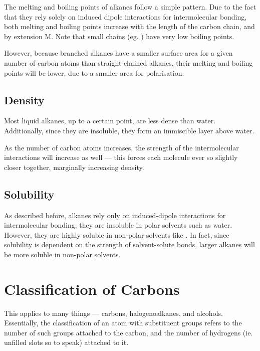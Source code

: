 			The melting and boiling points of alkanes follow a simple pattern. Due to the fact that they rely solely on induced
			dipole interactions for intermolecular bonding, both melting and boiling points increase with the length of the
			carbon chain, and by extension M. Note that small chains (eg. ) have very low boiling points.

			However, because branched alkanes have a smaller surface area for a given number of carbon atoms than straight-chained
			alkanes, their melting and boiling points will be lower, due to a smaller area for polarisation.


		\subsection{Density}

			Most liquid alkanes, up to a certain point, are less dense than water. Additionally, since they are insoluble,
			they form an immiscible layer above water.

			As the number of carbon atoms increases, the strength of the intermolecular interactions will increase as well --- this
			forces each molecule ever so slightly closer together, marginally increasing density.


		\subsection{Solubility}

			As described before, alkanes rely only on induced-dipole interactions for intermolecular bonding; they are insoluble in
			polar solvents such as water. However, they are highly soluble in non-polar solvents like . In fact,
			since solubility is dependent on the strength of solvent-solute bonds, larger alkanes will be more soluble in non-polar solvents.




	\pagebreak
	\section{Classification of Carbons}

		This applies to many things --- carbons, halogenoalkanes, and alcohols. Essentially, the classification of an atom with
		substituent groups refers to the number of such groups attached to the carbon, and the number of hydrogens (ie. unfilled
		slots so to speak) attached to it.

